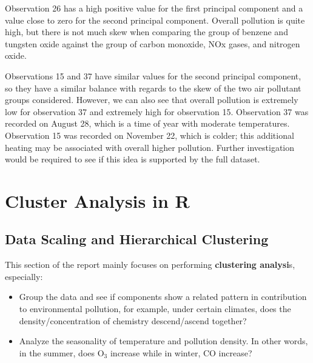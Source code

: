 \documentclass{article}
\begin{document}
\smallskip

Observation 26 has a high positive value for the first principal component and a value close to zero for the second principal component. Overall pollution is quite high, but there is not much skew when comparing the group of benzene and tungsten oxide against the group of carbon monoxide, NOx gases, and nitrogen oxide.

\smallskip

Observations 15 and 37 have similar values for the second principal component, so they have a similar balance with regards to the skew of the two air pollutant groups considered. However, we can also see that overall pollution is extremely low for observation 37 and extremely high for observation 15. Observation 37 was recorded on August 28, which is a time of year with moderate temperatures. Observation 15 was recorded on November 22, which is colder; this additional heating may be associated with overall higher pollution. Further investigation would be required to see if this idea is supported by the full dataset.

\section{Cluster Analysis in R}
\subsection{Data Scaling and Hierarchical Clustering}

This section of the report mainly focuses on performing \textbf{clustering analysi}s, especially: \par
\begin{itemize}
    \item Group the data and see if components show a related pattern in contribution to environmental pollution, for example, under certain climates, does the density/concentration of chemistry descend/ascend together?
    \item Analyze the seasonality of temperature and pollution density. In other words, in the summer, does $\mathrm{O_3}$ increase while in winter, $\mathrm{CO}$ increase?
\end{itemize}\par
\end{document}
